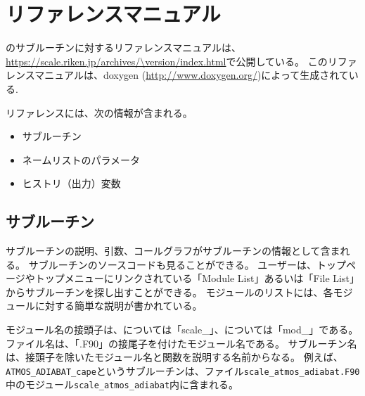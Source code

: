 \section{リファレンスマニュアル} \label{sec:reference_manual}
\scalelib のサブルーチンに対するリファレンスマニュアルは、\url{https://scale.riken.jp/archives/\version/index.html}で公開している。
このリファレンスマニュアルは、doxygen (\url{http://www.doxygen.org/})によって生成されている.

リファレンスには、次の情報が含まれる。
\begin{itemize}
\item サブルーチン
\item ネームリストのパラメータ
\item ヒストリ（出力）変数
\end{itemize}


\subsection{サブルーチン}
サブルーチンの説明、引数、コールグラフがサブルーチンの情報として含まれる。
サブルーチンのソースコードも見ることができる。
ユーザーは、トップページやトップメニューにリンクされている「Module List」あるいは「File List」からサブルーチンを探し出すことができる。
モジュールのリストには、各モジュールに対する簡単な説明が書かれている。

モジュール名の接頭子は、\scalelib については「scale\_」、\scalerm については「mod\_」である。
ファイル名は、「.F90」の接尾子を付けたモジュール名である。
サブルーチン名は、接頭子を除いたモジュール名と関数を説明する名前からなる。
例えば、\verb|ATMOS_ADIABAT_cape|というサブルーチンは、ファイル\verb|scale_atmos_adiabat.F90|中のモジュール\verb|scale_atmos_adiabat|内に含まれる。



